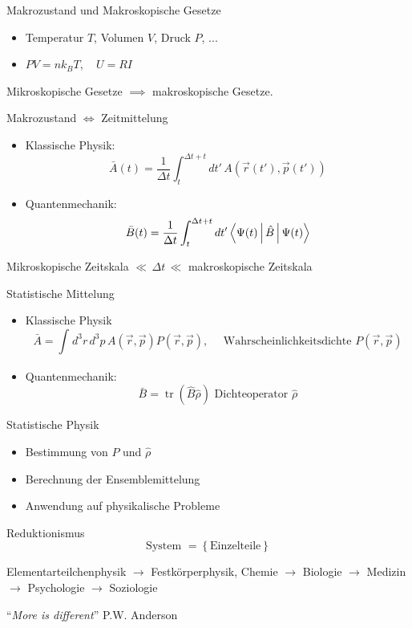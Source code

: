 \documentclass[11pt]{article}
\theoremstyle{plain}
\theoremstyle{mytheoremstyle}
\newcommand{\trace}{\operatorname{tr}}
\begin{document}
\begin{description}
  \item Makrozustand und Makroskopische Gesetze
    \begin{itemize}
      \item Temperatur $T$, Volumen $V$, Druck $P$, ...
      \item $P V=nk_BT, \quad U=RI$
    \end{itemize}
  \item Mikroskopische Gesetze $\implies $ makroskopische Gesetze.
  \item Makrozustand $\iff $ Zeitmittelung
    \begin{itemize}
      \item Klassische Physik: \[ \bar{A}(t)= \frac{1}{\Delta t} \int_{t}^{\Delta t +t}
        dt'\, A(\vec{r}(t'),\vec{p}(t'))\] 
      \item Quantenmechanik: \[ \bar{B}(t) = \frac{1}{\Delta t} \int_{t}^{\Delta t+t}
        dt' \Braket{\Psi(t) | \hat{B} | \Psi (t)}\] 
    \end{itemize}
  \item Mikroskopische Zeitskala $\ll\, \Delta t \, \ll$ makroskopische Zeitskala
  \item Statistische Mittelung
    \begin{itemize}
      \item Klassische Physik \[ \bar{A} = \int_{}^{} d^3r\, d^3p\,
        A(\vec{r}, \vec{p}) P(\vec{r}, \vec{p}), \quad
        \text{ Wahrscheinlichkeitsdichte } P(\vec{r}, \vec{p}) \] 
      \item Quantenmechanik: \[ \bar{B}= \trace(\hat{B} \hat{\rho})
          \text{ Dichteoperator } \hat{\rho} \]   
    \end{itemize}
  \item Statistische Physik
    \begin{itemize}
      \item Bestimmung von $P$ und $\hat{\rho}$
      \item Berechnung der Ensemblemittelung
      \item Anwendung auf physikalische Probleme
    \end{itemize}
  \item Reduktionismus \[ \text{System } = \left\{ \text{Einzelteile} \right\} \] 
  \item Elementarteilchenphysik $\to $ Festk\"orperphysik, Chemie $\to $
    Biologie $\to $ Medizin $\to $ Psychologie $\to $ Soziologie
  \item ``\emph{More is different}'' P.W. Anderson
    
\end{description}
\end{document}
